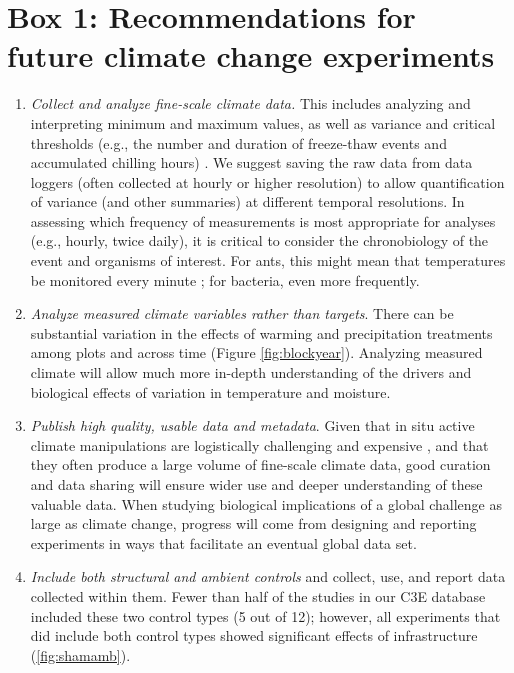 \documentclass{article}
\begin{document}
\section* {Box 1: Recommendations for future climate change experiments} 
\begin{enumerate}
\item\textit{Collect and analyze fine-scale climate data.} This includes analyzing and interpreting minimum and maximum values, as well as variance and critical thresholds (e.g., the number and duration of freeze-thaw events and accumulated chilling hours) \citep{mcdaniel2014,vasseur2014}. We suggest saving the raw data from data loggers (often collected at hourly or higher resolution) to allow quantification of variance (and other summaries) at different temporal resolutions. In assessing which frequency of measurements is most appropriate for analyses (e.g., hourly, twice daily), it is critical to consider the chronobiology of the event and organisms of interest. For ants, this might mean that temperatures be monitored every minute \citep{shavit2017}; for bacteria, even more frequently. 
\item\textit{Analyze measured climate variables rather than targets}. There can be substantial variation in the effects of warming and precipitation treatments among plots and across time (Figure \ref{fig:blockyear}). Analyzing measured climate will allow much more in-depth understanding of the drivers and biological effects of variation in temperature and moisture.
\item\textit{Publish high quality, usable data and metadata}. Given that in situ active climate manipulations are logistically challenging and expensive \citep{aronson2009}, and that they often produce a large volume of fine-scale climate data, good curation and data sharing will ensure wider use and deeper understanding of these valuable data. When studying biological implications of a global challenge as large as climate change, progress will come from designing and reporting experiments in ways that facilitate an eventual global data set. %
\item\textit{Include both structural and ambient controls} and collect, use, and report data collected within them. Fewer than half of the studies in our C3E database included these two control types (5 out of 12); however, all experiments that did include both control types showed significant effects of infrastructure (\ref{fig:shamamb}). %

\end{enumerate}
\end{document}
